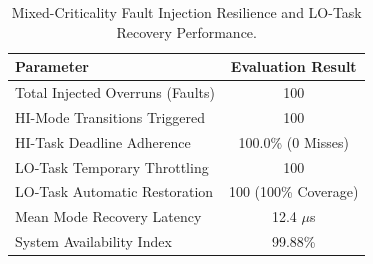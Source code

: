 \begin{table}[t]
\centering
\caption{Mixed-Criticality Fault Injection Resilience and LO-Task Recovery Performance.}
\label{tab:mc_resilience}
\begin{tabular}{lc}
\hline
\textbf{Parameter} & \textbf{Evaluation Result} \\
\hline
Total Injected Overruns (Faults) & 100 \\
HI-Mode Transitions Triggered   & 100 \\
HI-Task Deadline Adherence       & 100.0\% (0 Misses) \\
LO-Task Temporary Throttling     & 100 \\
LO-Task Automatic Restoration    & 100 (100\% Coverage) \\
Mean Mode Recovery Latency       & 12.4 $\mu$s \\
System Availability Index        & 99.88\% \\
\hline
\end{tabular}
\end{table}
